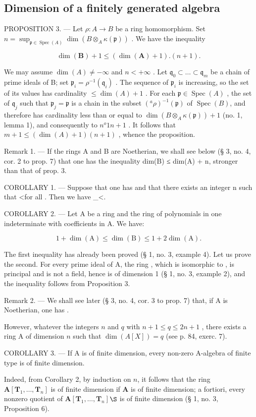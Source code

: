 \subsection{Dimension of a finitely generated algebra}

PROPOSITION 3. --- Let \(\rho: A \to B\) be a ring homomorphism. Set \(n = \sup_{\mathfrak{p} \in \operatorname{Spec}(A)} \dim(B \otimes_A \kappa(\mathfrak{p}))\) . We have the inequality

\[
\dim (\mathbf {B}) + 1 \leqslant (\dim (\mathbf {A}) + 1). (n + 1).
\]

We may assume \(\dim(A) \neq -\infty\) and \(n < +\infty\) . Let \(\mathfrak{q}_0 \subset \ldots \subset \mathfrak{q}_m\) be a chain of prime ideals of B; set \(\mathfrak{p}_i = \rho^{-1}(\mathfrak{q}_i)\) . The sequence of \(\mathfrak{p}_i\) is increasing, so the set of its values has cardinality \(\leqslant \dim(A) + 1\) . For each \(\mathfrak{p} \in \operatorname{Spec}(A)\) , the set of \(\mathfrak{q}_j\) such that \(\mathfrak{p}_j = \mathfrak{p}\) is a chain in the subset \(({}^{a}\rho)^{-1}(\mathfrak{p})\) of \(\operatorname{Spec}(B)\), and therefore has cardinality less than or equal to \(\dim(B \otimes_A \kappa(\mathfrak{p})) + 1\) (no. 1, lemma 1), and consequently to \(n^o 1\)\(n + 1\) . It follows that \(m + 1 \leqslant (\dim(A) + 1)(n + 1)\) , whence the proposition.

Remark 1. --- If the rings A and B are Noetherian, we shall see below (§ 3, no. 4, cor. 2 to prop. 7) that one has the inequality dim(B) ≤ dim(A) + n, stronger than that of prop. 3.

COROLLARY 1. --- Suppose that one has  and that there exists an integer n such that \textless for all {}. Then we have \_\textless{}.

COROLLARY 2. --- Let A be a ring and {}{} the ring of polynomials in one indeterminate with coefficients in A. We have:

\[
1 + \dim (\mathrm{A}) \leqslant \dim (\mathrm{B}) \leqslant 1 + 2 \dim (\mathrm{A}).
\]

The first inequality has already been proved (§ 1, no. 3, example 4). Let us prove the second. For every prime ideal  of A, the ring {, which is isomorphic to }{}, is principal and is not a field, hence is of dimension 1 (§ 1, no. 3, example 2), and the inequality follows from Proposition 3.

Remark 2. --- We shall see later (§ 3, no. 4, cor. 3 to prop. 7) that, if A is Noetherian, one has {}{}.

However, whatever the integers \(n\) and \(q\) with \(n + 1 \leqslant q \leqslant 2n + 1\) , there exists a ring A of dimension \(n\) such that \(\dim(A[X]) = q\) (see p. 84, exerc. 7).

COROLLARY 3. --- If A is of finite dimension, every non-zero A-algebra of finite type is of finite dimension.

Indeed, from Corollary 2, by induction on \(n\), it follows that the ring \(\mathbf{A}[\mathbf{T}_{1}, \ldots, \mathbf{T}_{n}]\) is of finite dimension if \(\mathbf{A}\) is of finite dimension; a fortiori, every nonzero quotient of \(\mathbf{A}[\mathbf{T}_{1}, \ldots, \mathbf{T}_{n}]\)\(\S\) is of finite dimension (§ 1, no. 3, Proposition 6).

